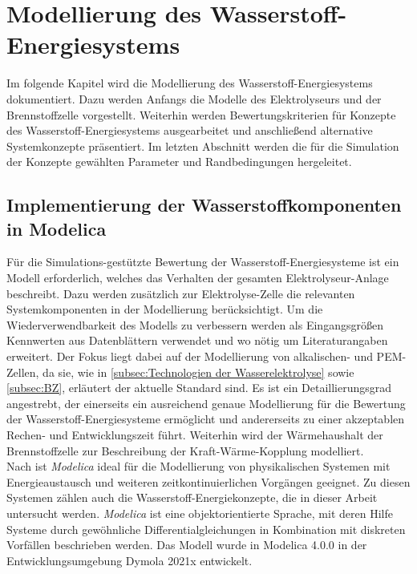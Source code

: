 \chapter{Modellierung des Wasserstoff-Energiesystems}
\label{cha:Methode}
Im folgende Kapitel wird die Modellierung des Wasserstoff-Energiesystems dokumentiert.
Dazu werden Anfangs die Modelle des Elektrolyseurs und der Brennstoffzelle vorgestellt. Weiterhin werden Bewertungskriterien für Konzepte des Wasserstoff-Energiesystems ausgearbeitet und anschließend alternative Systemkonzepte präsentiert. 
Im letzten Abschnitt werden die für die Simulation der Konzepte gewählten Parameter und Randbedingungen hergeleitet.

\section{Implementierung der Wasserstoffkomponenten in Modelica} 
Für die Simulations-gestützte Bewertung der Wasserstoff-Energiesysteme ist ein Modell erforderlich, welches das Verhalten der gesamten Elektrolyseur-Anlage beschreibt. Dazu werden zusätzlich zur Elektrolyse-Zelle die relevanten Systemkomponenten in der Modellierung berücksichtigt. Um die Wiederverwendbarkeit des Modells zu verbessern werden als Eingangsgrößen Kennwerten aus Datenblättern verwendet und wo nötig um Literaturangaben erweitert. Der Fokus liegt dabei auf der Modellierung von alkalischen- und PEM-Zellen, da sie, wie in \ref{subsec:Technologien der Wasserelektrolyse} sowie \ref{subsec:BZ}, erläutert der aktuelle Standard sind. Es ist ein Detaillierungsgrad angestrebt, der einerseits ein ausreichend genaue Modellierung für die Bewertung der Wasserstoff-Energiesysteme ermöglicht und andererseits zu einer akzeptablen Rechen- und Entwicklungszeit führt.
Weiterhin wird der Wärmehaushalt der Brennstoffzelle zur Beschreibung der Kraft-Wärme-Kopplung modelliert.\\

Nach \citet{schamai_modelica_2009} ist \textit{Modelica} ideal für die Modellierung von physikalischen Systemen mit Energieaustausch und weiteren zeitkontinuierlichen Vorgängen geeignet. Zu diesen Systemen zählen auch die Wasserstoff-Energiekonzepte, die in dieser Arbeit untersucht werden. \textit{Modelica} ist eine objektorientierte Sprache, mit deren Hilfe Systeme durch gewöhnliche Differentialgleichungen in Kombination  mit diskreten Vorfällen beschrieben werden. Das Modell wurde in Modelica 4.0.0 in der Entwicklungsumgebung Dymola 2021x entwickelt.\\

